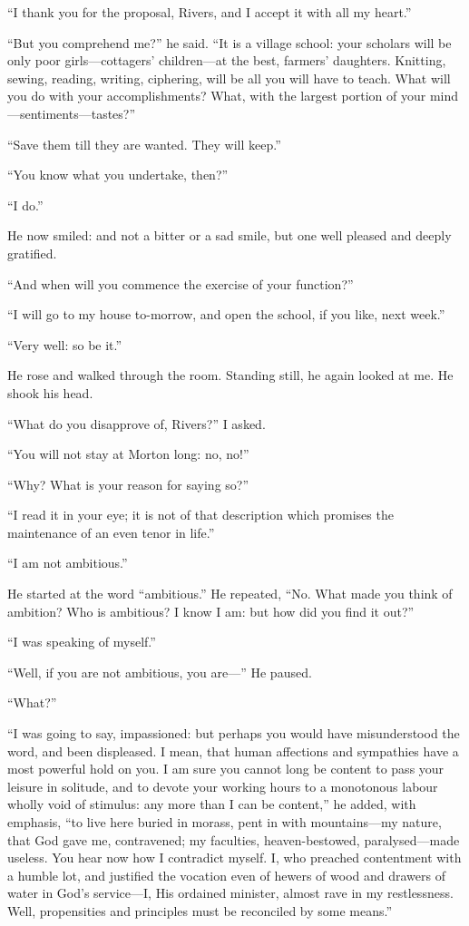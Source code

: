 \enquote{I thank you for the proposal, \Mr{} Rivers, and I accept it with
	all my heart.}

\enquote{But you comprehend me?} he said. \enquote{It is a village
	school: your scholars will be only poor girls---cottagers' children---at
	the best, farmers' daughters. Knitting, sewing, reading, writing,
	ciphering, will be all you will have to teach. What will you do with
	your accomplishments? What, with the largest portion of your
	mind---sentiments---tastes?}

\enquote{Save them till they are wanted. They will keep.}

\enquote{You know what you undertake, then?}

\enquote{I do.}

He now smiled: and not a bitter or a sad smile, but one well pleased and
deeply gratified.

\enquote{And when will you commence the exercise of your function?}

\enquote{I will go to my house to-morrow, and open the school, if you
	like, next week.}

\enquote{Very well: so be it.}

He rose and walked through the room. Standing still, he again looked at
me. He shook his head.

\enquote{What do you disapprove of, \Mr{} Rivers?} I asked.

\enquote{You will not stay at Morton long: no, no!}

\enquote{Why? What is your reason for saying so?}

\enquote{I read it in your eye; it is not of that description which
	promises the maintenance of an even tenor in life.}

\enquote{I am not ambitious.}

He started at the word \enquote{ambitious.} He repeated, \enquote{No.
	What made you think of ambition? Who is ambitious? I know I am: but
	how did you find it out?}

\enquote{I was speaking of myself.}

\enquote{Well, if you are not ambitious, you are---} He paused.

\enquote{What?}

\enquote{I was going to say, impassioned: but perhaps you would have
	misunderstood the word, and been displeased. I mean, that human
	affections and sympathies have a most powerful hold on you. I am sure
	you cannot long be content to pass your leisure in solitude, and to
	devote your working hours to a monotonous labour wholly void of
	stimulus: any more than I can be content,} he added, with emphasis,
\enquote{to live here buried in morass, pent in with mountains---my
	nature, that God gave me, contravened; my faculties, heaven-bestowed,
	paralysed---made useless. You hear now how I contradict myself. I, who
	preached contentment with a humble lot, and justified the vocation even
	of hewers of wood and drawers of water in God's service---I, His
	ordained minister, almost rave in my restlessness. Well, propensities
	and principles must be reconciled by some means.}

